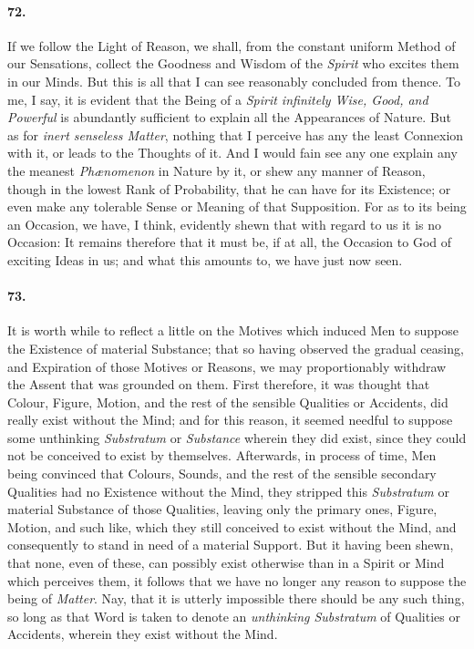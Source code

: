 \documentclass[]{article}
\newenvironment{sectionbody}{}{}
\begin{document}
\begin{sectionbody}
\paragraph{72.} If we follow the Light of Reason, we shall, from the constant
uniform Method of our Sensations, collect the Goodness and Wisdom
of the \emph{Spirit} who excites them in our Minds.  But this
is all that I can see reasonably concluded from thence.  To me, I
say, it is evident that the Being of a \emph{Spirit infinitely
Wise, Good, and Powerful} is abundantly sufficient to explain
all the Appearances of Nature.  But as for \emph{inert senseless
Matter}, nothing that I perceive has any the least Connexion
with it, or leads to the Thoughts of it.  And I would fain see
any one explain any the meanest \emph{Ph{\ae}nomenon} in
Nature by it, or shew any manner of Reason, though in the lowest
Rank of Probability, that he can have for its Existence; or even
make any tolerable Sense or Meaning of that Supposition.  For as
to its being an Occasion, we have, I think, evidently shewn that
with regard to us it is no Occasion: It remains therefore that it
must be, if at all, the Occasion to {\sc God} of exciting Ideas in us;
and what this amounts to, we have just now seen.



\paragraph{73.} It is worth while to reflect a little on the Motives which
induced Men to suppose the Existence of material Substance; that
so having observed the gradual ceasing, and Expiration of those
Motives or Reasons, we may proportionably withdraw the Assent
that was grounded on them.  First therefore, it was thought that
Colour, Figure, Motion, and the rest of the sensible Qualities or
Accidents, did really exist without the Mind; and for this
reason, it seemed needful to suppose some unthinking
\emph{Substratum} or \emph{Substance} wherein they did exist,
since they could not be conceived to exist by themselves.
Afterwards, in process of time, Men being convinced that Colours,
Sounds, and the rest of the sensible secondary Qualities had no
Existence without the Mind, they stripped this
\emph{Substratum} or material Substance of those Qualities,
leaving only the primary ones, Figure, Motion, and such like,
which they still conceived to exist without the Mind, and
consequently to stand in need of a material Support.  But it
having been shewn, that none, even of these, can possibly exist
otherwise than in a Spirit or Mind which perceives them, it
follows that we have no longer any reason to suppose the being of
\emph{Matter}.  Nay, that it is utterly impossible there should
be any such thing, so long as that Word is taken to denote an
\emph{unthinking Substratum} of Qualities or Accidents, wherein
they exist without the Mind.




\end{sectionbody}
\end{document}
